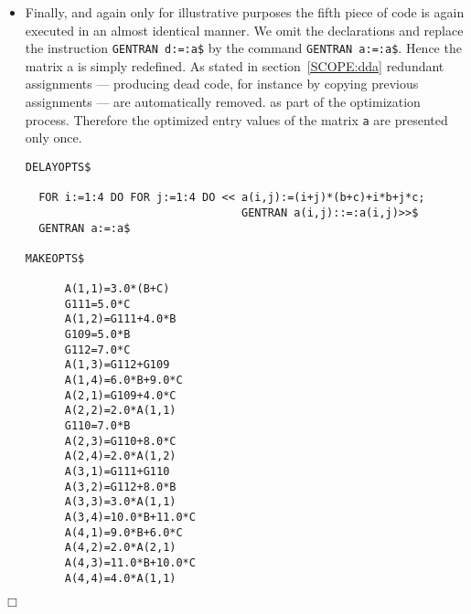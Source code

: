 \begin{itemize}
{\begin{verbatim}
DELAYDECS$

  GENTRAN DECLARE <<a(4,4),d(4,4),b,c:real>>$

  DELAYOPTS$

    FOR i:=1:4 DO FOR j:=1:4 DO << a(i,j):=(i+j)*(b+c)+i*b+j*c;
                                   GENTRAN a(i,j)::=:a(i,j)>>$
    GENTRAN d:=:a$

  MAKEOPTS$

MAKEDECS$

      REAL B,C,G56,G54,G57,G55,A(4,4),D(4,4)
      A(1,1)=3.0*(B+C)
      G56=5.0*C
      A(1,2)=G56+4.0*B
      G54=5.0*B
      G57=7.0*C
      A(1,3)=G57+G54
      A(1,4)=6.0*B+9.0*C
      A(2,1)=G54+4.0*c
      A(2,2)=2.0*A(1,1)
      G55=7.0*B
      A(2,3)=G55+8.0*C
      A(2,4)=2.0*A(1,2)
      A(3,1)=G56+G55
      A(3,2)=G57+8.0*B
      A(3,3)=3.0*A(1,1)
      A(3,4)=10.0*B+11.0*C
      A(4,1)=9.0*B+6.0*C
      A(4,2)=2.0*A(2,1)
      A(4,3)=11.0*B+10.0*C
      A(4,4)=4.0*A(1,1)
      D(1,1)=A(1,1)
      D(1,2)=A(1,2)
      D(1,3)=A(1,3)
      D(1,4)=A(1,4)
      D(2,1)=A(2,1)
      D(2,2)=A(2,2)
      D(2,3)=A(2,3)
      D(2,4)=A(2,4)
      D(3,1)=A(3,1)
      D(3,2)=A(3,2)
      D(3,3)=A(3,3)
      D(3,4)=A(3,4)
      D(4,1)=A(4,1)
      D(4,2)=A(4,2)
      D(4,3)=A(4,3)
      D(4,4)=A(4,4)
\end{verbatim}}
\item Finally, and again only for illustrative purposes the fifth piece of
code is again executed in an almost identical manner. We omit the declarations
and replace the instruction {\tt GENTRAN d:=:a}\verb+$+ by the command
{\tt GENTRAN a:=:a}\verb+$+. Hence the matrix a is simply redefined. As
stated in section~\ref{SCOPE:dda} redundant assignments --- producing dead
code, for instance by copying previous assignments --- are automatically
removed. as part of the optimization process. Therefore the optimized
entry values of the matrix {\tt a} are presented only once.
{\small
\begin{verbatim}
DELAYOPTS$

  FOR i:=1:4 DO FOR j:=1:4 DO << a(i,j):=(i+j)*(b+c)+i*b+j*c;
                                 GENTRAN a(i,j)::=:a(i,j)>>$
  GENTRAN a:=:a$

MAKEOPTS$

      A(1,1)=3.0*(B+C)
      G111=5.0*C
      A(1,2)=G111+4.0*B
      G109=5.0*B
      G112=7.0*C
      A(1,3)=G112+G109
      A(1,4)=6.0*B+9.0*C
      A(2,1)=G109+4.0*C
      A(2,2)=2.0*A(1,1)
      G110=7.0*B
      A(2,3)=G110+8.0*C
      A(2,4)=2.0*A(1,2)
      A(3,1)=G111+G110
      A(3,2)=G112+8.0*B
      A(3,3)=3.0*A(1,1)
      A(3,4)=10.0*B+11.0*C
      A(4,1)=9.0*B+6.0*C
      A(4,2)=2.0*A(2,1)
      A(4,3)=11.0*B+10.0*C
      A(4,4)=4.0*A(1,1)
\end{verbatim}}
\end{itemize}
{\small
\begin{flushright}
$\Box$
\end{flushright}}

